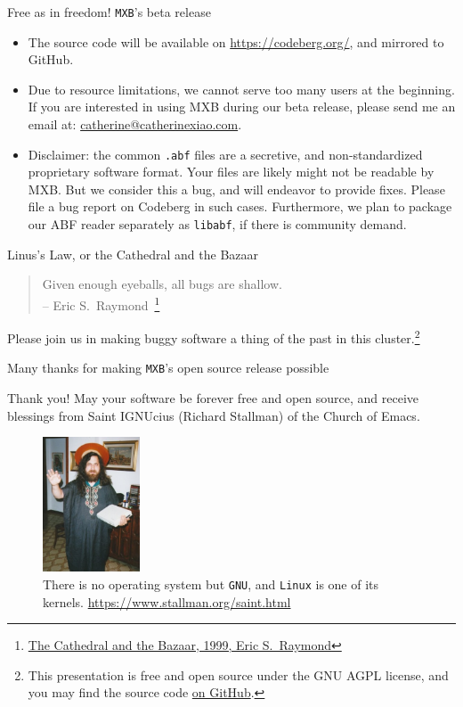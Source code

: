 \documentclass{beamer}
\begin{document}
\begin{frame}{Free as in freedom! \texttt{MXB}'s beta release}
    \begin{itemize}
        \item The source code will be available on \url{https://codeberg.org/}, and mirrored to GitHub.
        \item Due to resource limitations, we cannot serve too many users at the beginning. If you are interested in using MXB during our beta release, please send me an email at: \href{mailto:catherine@catherinexiao.com}{catherine@catherinexiao.com}.
        \item Disclaimer: the common \texttt{.abf} files are a secretive, and non-standardized proprietary software format. Your files are likely might not be readable by MXB. But we consider this a bug, and will endeavor to provide fixes. Please file a bug report on Codeberg in such cases. Furthermore, we plan to package our ABF reader separately as \texttt{libabf}, if there is community demand.
    \end{itemize}
\end{frame}

\begin{frame}{Linus's Law, or the Cathedral and the Bazaar}
    \begin{quotation}
        Given enough eyeballs, all bugs are shallow.\\
        -- Eric S.~Raymond~\footnote{\href{http://www.catb.org/~esr/writings/cathedral-bazaar/}{The Cathedral and the Bazaar, 1999, Eric S.~Raymond}}
    \end{quotation}

    Please join us in making buggy software a thing of the past in this cluster.\footnote{This presentation is free and open source under the GNU AGPL license, and you may find the source code \href{https://github.com/cathxiao/presentation-nanodiag-2025}{on GitHub}.}
\end{frame}

\begin{frame}{Many thanks for making \texttt{MXB}'s open source release possible}
    \pause
    \begin{block}{Thank you! May your software be forever free and open source, and receive blessings from Saint IGNUcius (Richard Stallman) of the Church of Emacs.}
        \begin{figure}
            \includegraphics[height=4cm]{assets/saintignucius.jpg}
            \caption{There is no operating system but \texttt{GNU}, and \texttt{Linux} is one of its kernels.
            \href{https://www.stallman.org/saint.html}{https://www.stallman.org/saint.html}}
        \end{figure}
    \end{block}
    
\end{frame}
\end{document}
